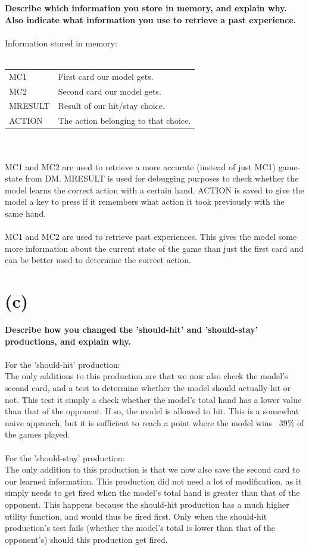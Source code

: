 \documentclass[11pt,a4paper,titlepage]{article}
\begin{document}
\textbf{Describe which information you store in memory, and explain
  why. Also indicate what information you use to retrieve a past
  experience.}
\\~\\
Information stored in memory:\\~\\
\begin{tabular}{@{$\bullet$}ll}
MC1 & First card our model gets.\\ 
MC2 & Second card our model gets.\\
MRESULT & Result of our hit/stay choice.\\
ACTION & The action belonging to that choice.\\
\end{tabular}
\\~\\
MC1 and MC2 are used to retrieve a more accurate (instead of just MC1)
game-state from DM.  MRESULT is used for debugging purposes to check
whether the model learns the correct action with a certain hand.
ACTION is saved to give the model a key to press if it remembers what
action it took previously with the same hand.
\\~\\
MC1 and MC2 are used to retrieve past experiences. This gives the
model some more information about the current state of the game than
just the first card and can be better used to determine the correct
action.
\section{(c)}
\label{sec:c}

\textbf{Describe how you changed the 'should-hit' and 'should-stay'
  productions, and explain why.}
\\~\\
For the 'should-hit' production: \\
The only additions to this production are that we now also check the
model's second card, and a test to determine whether the model should
actually hit or not. This test it simply a check whether the model's
total hand has a lower value than that of the opponent. If so, the
model is allowed to hit. This is a somewhat naive approach, but it is
sufficient to reach a point where the model wins ~39\% of the games
played.
\\~\\
For the 'should-stay' production: \\
The only addition to this production is that we now also save the
second card to our learned information.  This production did not need
a lot of modification, as it simply needs to get fired when the
model's total hand is greater than that of the opponent. This happens
because the should-hit production has a much higher utility function,
and would thus be fired first. Only when the should-hit production's
test fails (whether the model's total is lower than that of the
opponent's) should this production get fired.
\end{document}
